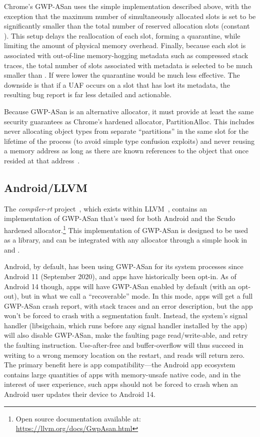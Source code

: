 Chrome's GWP-ASan uses the simple implementation described above, with the
exception that the maximum number of simultaneously allocated slots is set to
be significantly smaller than the total number of reserved allocation slots
(constant ). This setup delays the reallocation of each slot,
forming a quarantine, while limiting the amount of physical memory overhead.
Finally, because each slot is associated with out-of-line memory-hogging
metadata such as compressed stack traces, the total number of slots associated
with metadata is selected to be much smaller than . If
 were lower the quarantine would be much less effective.
The downside is that if a UAF occurs on a slot that has lost its metadata, the
resulting bug report is far less detailed and actionable.

Because GWP-ASan is an alternative allocator, it must provide at least the same
security guarantees as Chrome's hardened allocator, PartitionAlloc. This
includes never allocating object types from separate ``partitions'' in the same
slot for the lifetime of the process (to avoid simple type confusion exploits)
and never reusing a memory address as long as there are known references to the
object that once resided at that address~\cite{MiraclePtr}.

\subsection{Android/LLVM}

The \emph{compiler-rt} project~\cite{compiler-rt}, which exists within
LLVM~\cite{LattnerA2004}, contains an implementation of GWP-ASan that's used
for both Android and the Scudo hardened allocator.\footnote{Open source
documentation available at: \url{https://llvm.org/docs/GwpAsan.html}} This
implementation of GWP-ASan is designed to be used as a library, and can be
integrated with any allocator through a simple hook in  and
.

Android, by default, has been using GWP-ASan for its system processes since
Android 11 (September 2020), and apps have historically been opt-in. As of
Android 14 though, apps will have GWP-ASan enabled by default (with an
opt-out), but in what we call a ``recoverable'' mode. In this mode, apps will get
a full GWP-ASan crash report, with stack traces and an error description, but
the app won't be forced to crash with a segmentation fault. Instead, the
system's signal handler (libsigchain, which runs before any signal handler
installed by the app) will also disable GWP-ASan, make the faulting page
read/write-able, and retry the faulting instruction. Use-after-free and
buffer-overflow will thus succeed in writing to a wrong memory location on the
restart, and reads will return zero. The primary benefit here is app
compatibility---the Android app ecosystem contains large quantities of apps
with memory-unsafe native code, and in the interest of user experience, such
apps should not be forced to crash when an Android user updates their device to
Android 14.

